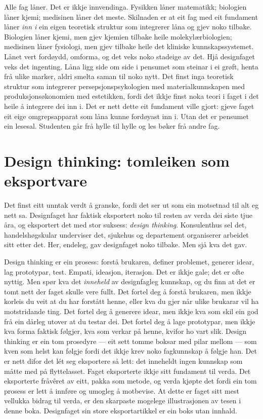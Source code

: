 Alle fag låner. Det er ikkje innvendinga. Fysikken låner matematikk; biologien låner kjemi; medisinen låner det meste. Skilnaden er at eit fag med eit fundament låner \emph{inn i} ein eigen teoretisk struktur som integrerer låna og gjev noko tilbake. Biologien låner kjemi, men gjev kjemien tilbake heile molekylærbiologien; medisinen låner fysiologi, men gjev tilbake heile det kliniske kunnskapssystemet. Lånet vert fordøydd, omforma, og det veks noko stadeige av det. Hjå designfaget veks det ingenting. Låna ligg side om side i pensumet som steinar i ei grøft, henta frå ulike marker, aldri smelta saman til noko nytt. Det finst inga teoretisk struktur som integrerer persepsjonspsykologien med materialkunnskapen med produksjonsøkonomien med estetikken, fordi det ikkje finst noka teori i faget i det heile å integrere dei inn i. Det er nett dette eit fundament ville gjort: gjeve faget eit eige omgrepsapparat som låna kunne fordøyast inn i. Utan det er pensumet ein lesesal. Studenten går frå hylle til hylle og les bøker frå andre fag.

\section{Design thinking: tomleiken som eksportvare}

Det finst eitt unntak verdt å granske, fordi det ser ut som ein motsetnad til alt eg nett sa. Designfaget har faktisk eksportert noko til resten av verda dei siste tjue åra, og eksportert det med stor suksess: \emph{design thinking}. Konsulenthus sel det, handelshøgskular underviser det, sjukehus og departement organiserer arbeidet sitt etter det. Her, endeleg, gav designfaget noko tilbake. Men sjå kva det gav.

Design thinking er ein prosess: forstå brukaren, definer problemet, generer idear, lag prototypar, test. Empati, ideasjon, iterasjon. Det er ikkje gale; det er ofte nyttig. Men spør kva det \emph{inneheld} av designfagleg kunnskap, og du finn at det er tomt nett der faget skulle vere fullt. Det fortel deg å forstå brukaren, men ikkje korleis du veit at du har forstått henne, eller kva du gjer når ulike brukarar vil ha motstridande ting. Det fortel deg å generere idear, men ikkje kva som skil ein god frå ein dårleg utover at du testar dei. Det fortel deg å lage prototypar, men ikkje kva forma faktisk følgjer, kva som verkar på henne, kvifor ho vart slik. Design thinking er ein tom prosedyre — eit sett tomme boksar med pilar mellom — som kven som helst kan følgje fordi det ikkje krev noko fagkunnskap å følgje han. Det er nett difor det lét seg eksportere så lett: det inneheldt ingen kunnskap som måtte med på flyttelasset. Faget eksporterte ikkje sitt fundament til verda. Det eksporterte fråvêret av eitt, pakka som metode, og verda kjøpte det fordi ein tom prosess er lett å innføre og umogleg å motbevise. At dette er faget sitt mest vellukka bidrag til verda, er den skarpaste mogelege illustrasjonen av tesen i denne boka. Designfaget sin store eksportartikkel er ein boks utan innhald.

